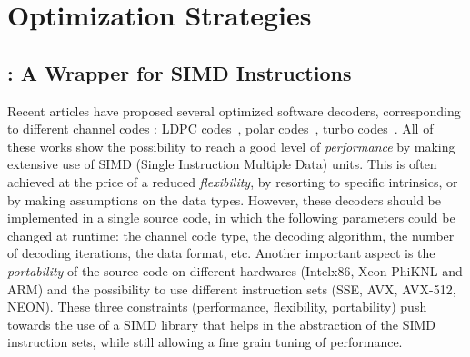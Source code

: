 \graphicspath{{main/chapter3/fig/}}

\chapter{Optimization Strategies}

\minitoccustom





\section{\MIPP: A \Cxx Wrapper for SIMD Instructions}

Recent articles have proposed several optimized software decoders, corresponding
to different channel codes : LDPC codes~\cite{LeGal2015,LeGal2016}, polar
codes~\cite{Giard2016b,Sarkis2016,Cassagne2015c,Cassagne2016b}, turbo
codes~\cite{Zhang2012,Wu2013,Cassagne2016a}. All of these works show the
possibility to reach a good level of \textit{performance} by  making extensive
use of SIMD (Single Instruction Multiple Data) units. This is often achieved at
the price of a reduced \textit{flexibility}, by resorting to specific
intrinsics, or by making assumptions on the data types. However, these decoders
should be implemented in a single source code, in which the following parameters
could be changed at runtime: the channel code type, the decoding algorithm, the
number of decoding iterations, the data format, etc. Another important aspect is
the \textit{portability} of the source code on different hardwares (Intel\R x86,
Xeon Phi\TM KNL and ARM\R) and the possibility to use different instruction sets
(SSE, AVX, AVX-512, NEON). These three constraints (performance, flexibility,
portability) push towards the use of a SIMD library that helps in the
abstraction of the SIMD instruction sets, while still allowing a fine grain
tuning of performance.

